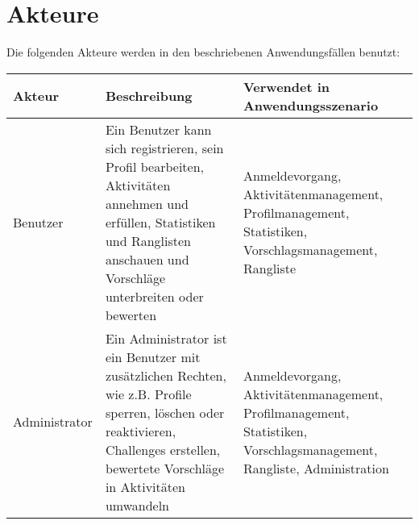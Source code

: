 \section{Akteure}
Die folgenden Akteure werden in den beschriebenen Anwendungsfällen benutzt: 

\begin{tabularx}{\textwidth}{|l|X|X|}
\hline Akteur & Beschreibung & Verwendet in Anwendungsszenario \\
\hline Benutzer & Ein Benutzer kann sich registrieren, sein Profil bearbeiten, Aktivitäten annehmen und erfüllen, Statistiken und Ranglisten anschauen und Vorschläge unterbreiten oder bewerten & Anmeldevorgang, Aktivitätenmanagement, Profilmanagement, Statistiken, Vorschlagsmanagement, Rangliste \\
\hline Administrator & Ein Administrator ist ein Benutzer mit zusätzlichen Rechten, wie z.B. Profile sperren, löschen oder reaktivieren, Challenges erstellen, bewertete Vorschläge in Aktivitäten umwandeln & Anmeldevorgang, Aktivitätenmanagement, Profilmanagement, Statistiken, Vorschlagsmanagement, Rangliste, Administration\\
\hline
\end{tabularx}